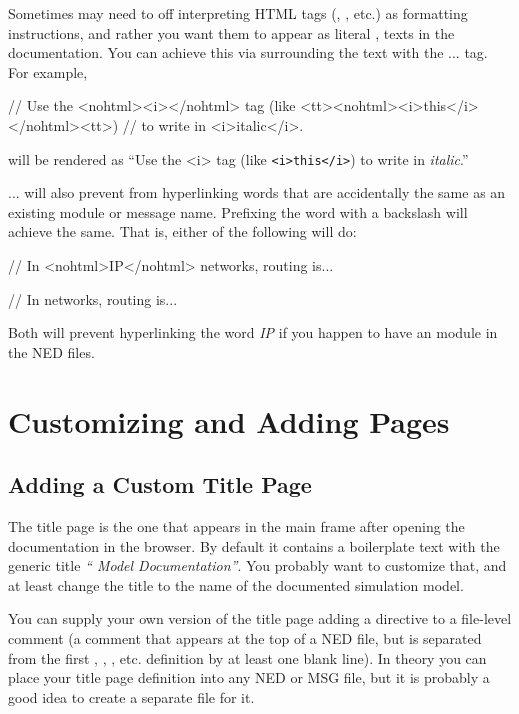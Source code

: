 Sometimes may need to off interpreting HTML tags (, , etc.)
as formatting instructions, and rather you want them to appear as literal
,  texts in the documentation. You can achieve this via
surrounding the text with the ... tag.
For example,

\begin{ned}
// Use the <nohtml><i></nohtml> tag (like <tt><nohtml><i>this</i></nohtml><tt>)
// to write in <i>italic</i>.
\end{ned}

will be rendered as ``Use the <i> tag (like \texttt{<i>this</i>}) to write
in \textit{italic}.''

... will also prevent 
from hyperlinking words that are accidentally the same as an existing
module or message name. Prefixing the word with a backslash will achieve
the same. That is, either of the following will do:

\begin{ned}
// In <nohtml>IP</nohtml> networks, routing is...
\end{ned}

\begin{ned}
// In \IP networks, routing is...
\end{ned}

Both will prevent hyperlinking the word \textit{IP} if you happen to have
an  module in the NED files.



\section{Customizing and Adding Pages}

\subsection{Adding a Custom Title Page}

The title page is the one that appears in the main frame after
opening the documentation in the browser. By default it contains
a boilerplate text with the generic title \textit{``{\opp} Model Documentation''}.
You probably want to customize that, and at least change the title
to the name of the documented simulation model.

You can supply your own version of the title page adding a 
directive to a file-level comment (a comment that appears at the top of
a NED file, but is separated from the first , ,
, etc. definition by at least one blank line).
In theory you can place your title page definition into
any NED or MSG file, but it is probably a good idea to create
a separate  file for it.

